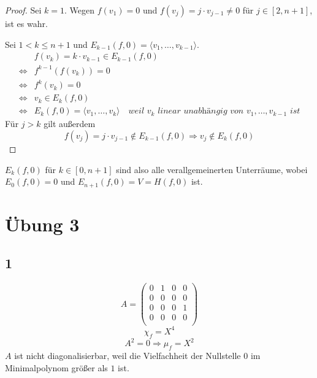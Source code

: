 \documentclass[10pt,a4paper]{article}
\begin{document}
\begin{proof}
Sei $k = 1$.
Wegen $f(v_1) = 0$ und $f(v_{j}) = j \cdot v_{j - 1} \ne 0$ für $j \in [2, n + 1]$, ist es wahr.

Sei $1 < k \le n + 1$ und $E_{k - 1}(f, 0) = \langle v_{1}, \dots, v_{k - 1} \rangle$.
\begin{align}
& f(v_{k}) = k \cdot v_{k - 1} \in E_{k - 1}(f, 0)\\
\Leftrightarrow & f^{k - 1}(f(v_{k})) = 0\\
\Leftrightarrow & f^{k}(v_{k}) = 0\\
\Leftrightarrow & v_{k} \in E_{k}(f, 0)\\
\Leftrightarrow & E_{k}(f, 0) = \langle v_{1}, \dots, v_{k} \rangle \quad \textit{weil $v_{k}$ linear unabhängig von $v_{1}, \dots, v_{k - 1}$ ist}
\end{align}
Für $j > k$ gilt außerdem
\begin{equation}
f(v_{j}) = j \cdot v_{j - 1} \notin E_{k - 1}(f, 0) \Rightarrow v_{j} \notin E_{k}(f, 0)
\end{equation}
\end{proof}

$E_{k}(f, 0)$ für $k \in [0, n + 1]$ sind also alle verallgemeinerten Unterräume, wobei $E_{0}(f, 0) = 0$ und $E_{n + 1}(f, 0) = V = H(f, 0)$ ist.

\section*{Übung 3}

\subsection*{1}

\begin{equation}
A = 
\begin{pmatrix}
0 & 1 & 0 & 0\\
0 & 0 & 0 & 0\\
0 & 0 & 0 & 1\\
0 & 0 & 0 & 0\\
\end{pmatrix}
\end{equation}
\begin{equation}
\chi_{f} = X^{4}
\end{equation}
\begin{equation}
A^{2} = 0 \Rightarrow \mu_{f} = X^{2}
\end{equation}
$A$ ist nicht diagonalisierbar, weil die Vielfachheit der Nullstelle $0$ im Minimalpolynom größer als $1$ ist.
\end{document}
